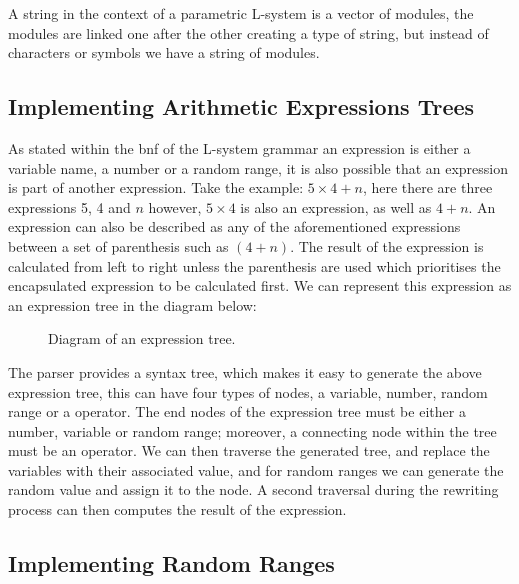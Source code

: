 A string in the context of a parametric L-system is a vector of modules, the modules are linked one after the other creating a type of string, but instead of characters or symbols we have a string of modules.

\subsection{Implementing Arithmetic Expressions Trees} \label{expression tree}

As stated within the \acrshort{bnf} of the L-system grammar an expression is either a variable name, a number or a random range, it is also possible that an expression is part of another expression. Take the example: $5 \times 4 + n$, here there are three expressions 5, 4 and $n$ however, $5 \times 4$ is also an expression, as well as $4 + n$. An expression can also be described as any of the aforementioned expressions between a set of parenthesis such as $(4+n)$. The result of the expression is calculated from left to right unless the parenthesis are used which prioritises the encapsulated expression to be calculated first. We can represent this expression as an expression tree in the diagram below:


\begin{figure}[htbp]
	{\centering
		\setlength{\fboxrule}{1pt}
		\vspace{7px}
		\caption{Diagram of an expression tree.} \label{3D rotations}
	}
\end{figure}
\FloatBarrier

\noindent
The parser provides a syntax tree, which makes it easy to generate the above expression tree, this can have four types of nodes, a variable, number, random range or a operator. The end nodes of the expression tree must be either a number, variable or random range; moreover, a connecting node within the tree must be an operator. We can then traverse the generated tree, and replace the variables with their associated value, and for random ranges we can generate the random value and assign it to the node. A second traversal during the rewriting process can then computes the result of the expression. 

\subsection{Implementing Random Ranges}

